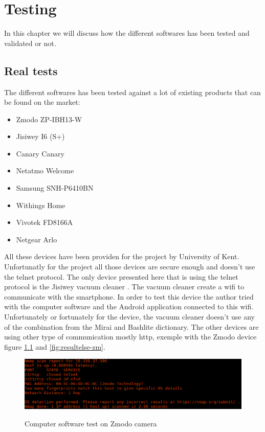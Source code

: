 \documentclass{report}
\begin{document}
\chapter{Testing}
In this chapter we will discuss how the different softwares has been tested and validated or not.
\section{Real tests}
The different softwares has been tested against a lot of existing products that can be found on the market:
\begin{itemize}
 \item Zmodo ZP-IBH13-W \autocite{zmodo}
 \item Jisiwey I6 (S+) \autocite{jisiwey}
 \item Canary Canary \autocite{canary}
 \item Netatmo Welcome \autocite{netatmo}
 \item Samsung SNH-P6410BN \autocite{samsung}
 \item Withings Home \autocite{withings}
 \item Vivotek FD8166A \autocite{vivotek}
 \item Netgear Arlo \autocite{netgear}
\end{itemize}
All these devices have been providen for the project by University of Kent. Unfortunatly for the project all those devices are secure enough and doesn't use the telnet protocol. The only device presented here that is using the telnet protocol is the Jisiwey vacuum cleaner \autocite{jisiwey}.\newline
The vacuum cleaner create a wifi to communicate with the smartphone. In order to test this device the author tried with the computer software and the Android application connected to this wifi. Unfortunately or fortunately for the device, the vacuum cleaner doesn't use any of the combination from the Mirai and Bashlite dictionary.\newline
The other devices are using other type of communication mostly http, exemple with the Zmodo device figure \ref{fig:result-zm} and \ref{fig:resultelse-zm}.
\begin{figure}[h]
 \caption{Computer software test on Zmodo \protect\footnotemark camera}
 \centering
 \includegraphics[width=1.2\textwidth]{./img/exp/result}
 \label{fig:result-zm}
\end{figure}
\end{document}
